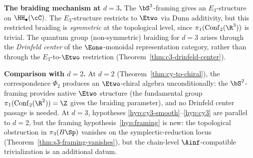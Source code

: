 \begin{theorem}[\texorpdfstring{$\Phi.3$}{Phi.3}: framed object-level \texorpdfstring{$d = 3$}{d = 3} locus]
\medskip\noindent\textbf{The braiding mechanism at $d = 3$.}
The $\bS^3$-framing gives an $E_3$-structure on $\HH_\bullet(\cC)$. The $E_3$-structure restricts to $\Etwo$ via Dunn additivity, but this restricted braiding is \emph{symmetric} at the topological level, since $\pi_1(\mathrm{Conf}_2(\R^3))$ is trivial. The quantum group (non-symmetric) braiding for $d = 3$ arises through the \emph{Drinfeld center} of the $\Eone$-monoidal representation category, rather than through the $E_3$-to-$\Etwo$ restriction (Theorem~\ref{thm:c3-drinfeld-center}).

\medskip\noindent\textbf{Comparison with $d = 2$.}
At $d = 2$ (Theorem~\textup{\ref{thm:cy-to-chiral}}), the correspondence $\Phi_2$ produces an $\Etwo$-chiral algebra unconditionally: the $\bS^2$-framing provides native $\Etwo$ structure (the fundamental group $\pi_1(\mathrm{Conf}_2(\R^2)) = \Z$ gives the braiding parameter), and no Drinfeld center passage is needed. At $d = 3$, hypotheses \ref{hyp:cy3-smooth}--\ref{hyp:cy3} are parallel to $d = 2$, but the framing hypothesis~\ref{hyp:framing} is new: the topological obstruction in $\pi_3(B\Sp)$ vanishes on the symplectic-reduction locus (Theorem~\textup{\ref{thm:s3-framing-vanishes}}), but the chain-level $\Ainf$-compatible trivialization is an additional datum.


\end{theorem}
